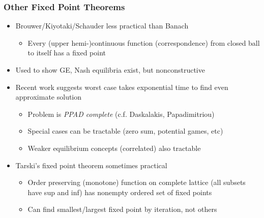 \documentclass[bigger]{beamer}
\begin{document}
\begin{frame}

\frametitle{Other Fixed Point Theorems}

\begin{itemize}

\item Brouwer/Kiyotaki/Schauder less practical than Banach 
\begin{itemize}
\item Every (upper hemi-)continuous function (correspondence) from closed ball to itself has a fixed point
\end{itemize}
\item Used to show GE, Nash equilibria exist, but nonconstructive
\item Recent work suggests worst case takes exponential time to find even approximate solution
\begin{itemize}
\item Problem is \emph{PPAD complete} (c.f. Daskalakis, Papadimitriou) 
\item Special cases can be tractable (zero sum, potential games, etc)
\item Weaker equilibrium concepts (correlated) also tractable
\end{itemize}

\item Tarski's fixed point theorem sometimes practical
\begin{itemize}
\item Order preserving (monotone) function on complete lattice (all subsets have sup and inf) has nonempty ordered set of fixed points
\item Can find smallest/largest fixed point by iteration, not others
\end{itemize}



\end{itemize}


\end{frame}%

\end{document}
